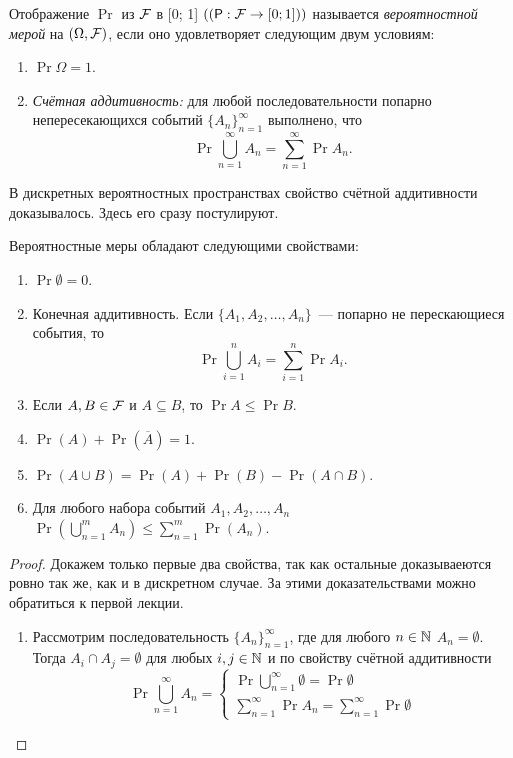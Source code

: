 \begin{itemize}
	\begin{definition}
		Отображение $ \Pr $ из $ \mathcal{F} $ в [0; 1] \(\left( (\Pr: \F \to [0; 1]) \right)\) называется \emph{вероятностной мерой} на \( (\Omega, \mathcal{F}) \), если оно удовлетворяет следующим двум условиям:
		\begin{enumerate}
			\item \(\Pr{\Omega} = 1\).
			\item \emph{Счётная аддитивность:} для любой последовательности попарно непересекающихся событий \(\{A_n\}_{n = 1}^{\infty}\) выполнено, что
			\[
			\Pr{\bigcup\limits_{n = 1}^{\infty}A_n} = \sum\limits_{n = 1}^{\infty}\Pr{A_n}.
			\]
		\end{enumerate}
	\end{definition}
	В дискретных вероятностных пространствах свойство счётной аддитивности доказывалось. Здесь его сразу постулируют.
	
	\begin{lemma}
		Вероятностные меры обладают следующими свойствами:
		\begin{enumerate}
			\item \(\Pr{\emptyset} = 0\).
			
			\item Конечная аддитивность. Если \(\{A_1, A_2, \dots, A_n\}\)~--- попарно не перескающиеся события, то
			\[
			\Pr{\bigcup\limits_{i = 1}^{n} A_i} = \sum\limits_{i = 1}^{n}\Pr{A_i}.
			\]
			
			\item Если \(A, B \in \mathcal{F}\) и \(A \subseteq B\), то \(\Pr{A} \leq \Pr{B} \).
			
			\item \(\Pr(A) + \Pr(\overline{A}) = 1\).
			
			\item \(\Pr(A \cup B) = \Pr(A) + \Pr(B) - \Pr(A \cap B)\).
			\item Для любого набора событий \(A_1, A_2, \ldots, A_n\) \(\Pr\left(\bigcup\limits_{n = 1}^{m} A_n\right) \leq \sum\limits_{n = 1}^{m} \Pr(A_n)\).
		\end{enumerate}
	\end{lemma}
	
	\begin{proof}
		Докажем только первые два свойства, так как остальные доказываеются ровно так же, как и в дискретном случае. За этими доказательствами можно обратиться к первой лекции.
		
		\begin{enumerate}
			\item Рассмотрим последовательность \(\{A_n\}_{n = 1}^{\infty}\), где для любого \(n \in \mathbb{N}\) \(A_n = \emptyset\). Тогда \(A_i \cap A_j = \emptyset\) для любых \(i, j \in \mathbb{N}\) и по свойству счётной аддитивности
			\[
			\Pr{\bigcup\limits_{n = 1}^{\infty}A_n} = \begin{cases}
			\Pr{\bigcup\limits_{n = 1}^{\infty} \emptyset} = \Pr{\emptyset} \\
			\sum\limits_{n = 1}^{\infty}\Pr{A_n} = \sum\limits_{n = 1}^{\infty}\Pr{\emptyset}
			\end{cases}
			\]
			

\end{enumerate}
\end{proof}
\end{itemize}
